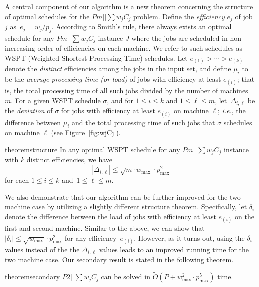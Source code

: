 \documentclass[11pt]{llncs}
\begin{document}
A central component of our algorithm is a new theorem concerning the structure of optimal schedules for the $Pm||\sum w_jC_j$ problem. Define the \emph{efficiency} $e_j$ of job $j$ as~$e_j = w_j / p_j$. According to Smith's rule, there always exists an optimal schedule for any $Pm||\sum w_jC_j$ instance $J$ where the jobs are scheduled in non-increasing order of efficiencies on each machine. We refer to such schedules as WSPT (Weighted Shortest Processing Time) schedules. Let $e_{(1)} > \cdots > e_{(k)}$ denote the \emph{distinct} efficiencies among the jobs in the input set, and define $\mu_i$ to be the \emph{average processing time (or load)} of jobs with efficiency at least $e_{(i)}$; that is, the total processing time of all such jobs divided by the number of machines~$m$. For a given WSPT schedule $\sigma$, and for  $1 \leq i \leq k$ and $1 \leq \ell \leq m$, let~$\Delta_{i,\ell}$ be the \emph{deviation} of $\sigma$ for jobs with efficiency at least $e_{(i)}$ on machine $\ell$; \emph{i.e.}, the difference between $\mu_i$ and the total processing time of such jobs that $\sigma$ schedules on machine $\ell$ (see Figure~\ref{fig:wjCj}). 
\begin{restatable}{theorem}{structure}
\label{thm:structure}%
In any optimal WSPT schedule for any $Pm||\sum w_j C_j$ instance with $k$ distinct efficiencies, we have 
$$
|\Delta_{i,\ell}| \leq  \sqrt{m \cdot w_{\max}} \cdot p_{\max}^2
$$ 
for each $1 \leq i \leq k$ and~$1 \leq \ell \leq m$.    
\end{restatable}

We also demonstrate that our algorithm can be further improved for the two-machine case by utilizing a slightly different structure theorem. Specifically, let $\delta_i$ denote the difference between the load of jobs with efficiency at least $e_{(i)}$ on the first and second machine. Similar to the above, we can show that $|\delta_i| \leq \sqrt{w_{\max}} \cdot p^2_{\max}$ for any efficiency~$e_{(i)}$. However, as it turns out, using the $\delta_i$ values instead of the the $\Delta_{i,\ell}$ values leads to an improved running time for the two machine case. Our secondary result is stated in the following theorem.
\begin{restatable}{theorem}{secondary}
\label{thm:secondary}%
$P2||\sum w_jC_j$ can be solved in $\widetilde{O}(P + w_{\max}^{2} \cdot p_{\max}^{5})$ time.
\end{restatable}

\end{document}
